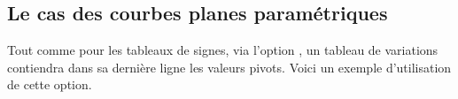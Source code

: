\documentclass[12pt, a4paper]{article}
\begin{document}

\subsection{Le cas des courbes planes paramétriques}

Tout comme pour les tableaux de signes, via l'option , un tableau de variations contiendra dans sa dernière ligne les valeurs pivots. Voici un exemple d'utilisation de cette option. 
\end{document}
